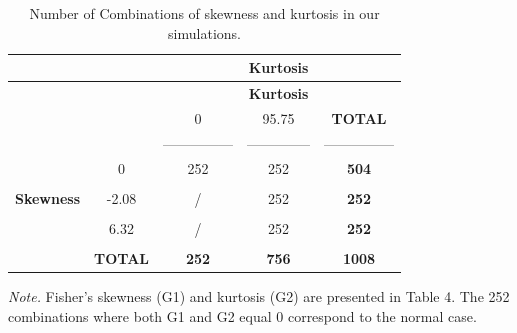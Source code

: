 \documentclass[
  man,floatsintext]{apa6}
\begin{document}
\begin{longtable}[]{@{}ccccc@{}}
\caption{Number of Combinations of skewness and kurtosis in our simulations.}\tabularnewline
\toprule
& & & \textbf{Kurtosis} &\tabularnewline
\midrule
\endfirsthead
\toprule
& & & \textbf{Kurtosis} &\tabularnewline
\midrule
\endhead
& & 0 & 95.75 & \textbf{TOTAL}\tabularnewline
& & --------------- & -------------- & ---------------\tabularnewline
& 0 & 252 & 252 & \textbf{504}\tabularnewline
& & & &\tabularnewline
\textbf{Skewness} & -2.08 & / & 252 & \textbf{252}\tabularnewline
& & & &\tabularnewline
& 6.32 & / & 252 & \textbf{252}\tabularnewline
& & & &\tabularnewline
& \textbf{TOTAL} & \textbf{252} & \textbf{756} & \textbf{1008}\tabularnewline
\bottomrule
\end{longtable}

\emph{Note.} Fisher's skewness (G1) and kurtosis (G2) are presented in Table 4. The 252 combinations where both G1 and G2 equal 0 correspond to the normal case.
\end{document}
